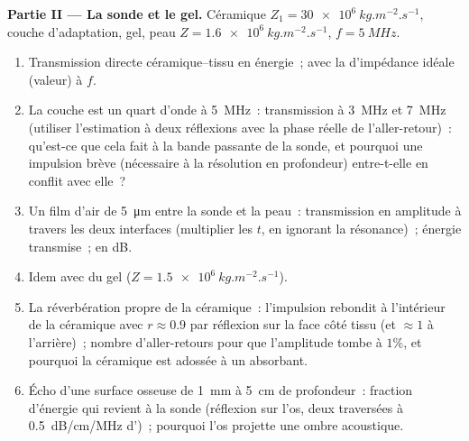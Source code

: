 \begin{problem}
\medskip
\noindent\textbf{Partie II --- La sonde et le gel.}
Céramique $Z_1 = \qty{30e6}{kg.m^{-2}.s^{-1}}$, couche d'adaptation, gel, peau $Z =
\qty{1.6e6}{kg.m^{-2}.s^{-1}}$, $f = \qty{5}{MHz}$.
\begin{enumerate}[resume]
  \item Transmission directe céramique--tissu en énergie~; avec la
         d'impédance idéale (valeur) à $f$.
  \item La couche est un quart d'onde à \qty{5}{MHz}~: transmission
        à \qty{3}{MHz} et \qty{7}{MHz} (utiliser l'estimation à deux réflexions
        avec la phase réelle de l'aller-retour)~: qu'est-ce que cela fait à la
        bande passante de la sonde, et pourquoi une impulsion brève (nécessaire à la
        résolution en profondeur) entre-t-elle en conflit avec elle~?
  \item Un film d'air de \qty{5}{\micro m} entre la sonde et la peau~: transmission
        en amplitude à travers les deux interfaces (multiplier les $t$,
        en ignorant la résonance)~; énergie transmise~; en dB.
  \item Idem avec du gel ($Z = \qty{1.5e6}{kg.m^{-2}.s^{-1}}$).
  \item La réverbération propre de la céramique~: l'impulsion rebondit à l'intérieur
        de la céramique avec $r \approx 0.9$ par réflexion sur la face côté tissu
        (et $\approx 1$ à l'arrière)~; nombre d'aller-retours pour que
        l'amplitude tombe à $1\%$, et pourquoi la céramique est adossée à
        un absorbant.
  \item Écho d'une surface osseuse de \qty{1}{mm} à \qty{5}{cm} de profondeur~: fraction
        d'énergie qui revient à la sonde (réflexion sur l'os, deux
        traversées à \qty{0.5}{dB/cm/MHz} d')~; pourquoi l'os projette une
        ombre acoustique.
\end{enumerate}


\end{problem}
